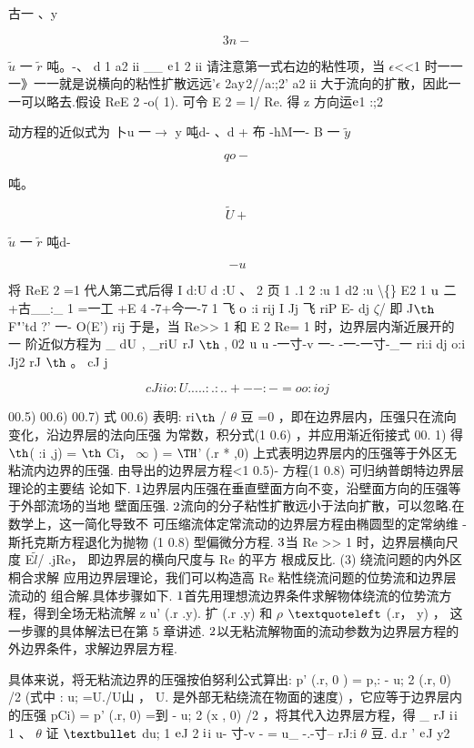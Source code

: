 古一 、y

\[3n-\]

$\tilde{u}$ 一 $\tilde{r}$ 吨。-、 d 1 a2 ii \_\_ ${\rm e}$1 2 ii 请注意第一式右边的粘性项，当 $\epsilon$<<1 时一一一》一一就是说横向的粘性扩散远远'$\epsilon$ 2a${\rm y}$2//a:;2' a2 ii 大于流向的扩散，因此一一可以略去.假设 ReE 2 -o( 1). 可令 E 2 = l/ Re. 得 z 方向运${\rm e}$1 :;2

动方程的近似式为 卜u 一$\rightarrow$ y 吨d- 、d + 布 -hM一- B 一 $\tilde{y}$

\[qo-\]

吨。

\[\tilde{U} +\]

$\tilde{u}$ 一 $\tilde{r}$ 吨d-

\[-u\]

将 ReE 2 =1 代人第二式后得 I d:U d :U 、 2 页 1 .1 2 :u 1 d2 :u \textbackslash\{\} E2 1 ${\rm u}$ 二+古\_\_:\_ 1 =一工 +E 4 -7+今一-7 1 飞 ${\rm o}$ :i rij I Jj 飞 riP E- dj $\zeta$/ 即 J${\rm þ}$ F"'td ?' 一- O(E') rij 于是，当 Re>> 1 和 E 2 Re= 1 时，边界层内渐近展开的 一 阶近似方程为 \_ d${\rm U}$ , \_ri${\rm U}$ rJ ${\rm þ}$ , 02 ${\rm u}$ u -一寸-v 一- -一-一寸-\_一 ri:i dj o:i Jj2 rJ ${\rm þ}$ 。 cJ j

\[cJ ii o:U .....:.:..+--:-=o o:i oj\]

00.5) 00.6) 00.7) 式 00.6) 表明: ri${\rm þ}$ / $\theta$ 豆 =0 ，即在边界层内，压强只在流向变化，沿边界层的法向压强 为常数，积分式(1 0.6) ，并应用渐近衔接式 00. 1) 得 ${\rm þ}$( :i ,j) = ${\rm þ}$ Ci， $\infty$ ) = ${\rm Þ}$' (.r * ,0) 上式表明边界层内的压强等于外区无粘流内边界的压强. 由导出的边界层方程<1 0.5)- 方程(1 0.8) 可归纳普朗特边界层理论的主要结 论如下. ${\rm 1}$边界层内压强在垂直壁面方向不变，沿壁面方向的压强等于外部流场的当地 壁面压强. ${\rm 2}$流向的分子粘性扩散远小于法向扩散，可以忽略.在数学上，这一简化导致不 可压缩流体定常流动的边界层方程由椭圆型的定常纳维 - 斯托克斯方程退化为抛物 (1 0.8) 型偏微分方程. ${\rm 3}$当 Re >> 1 时，边界层横向尺度 E$\tilde{l}$/ .jRe， 即边界层的横向尺度与 Re 的平方 根成反比. (3) 绕流问题的内外区桐合求解 应用边界层理论，我们可以构造高 Re 粘性绕流问题的位势流和边界层流动的 组合解.具体步骤如下. ${\rm 1}$首先用理想流边界条件求解物体绕流的位势流方程，得到全场无粘流解 z u' (.r .y). 扩 (.r .y) 和 $\rho$ ${\rm ‘}$ (.r， y) ， 这一步骤的具体解法已在第 5 章讲述. ${\rm 2}$以无粘流解物面的流动参数为边界层方程的外边界条件，求解边界层方程.

具体来说，将无粘流边界的压强按伯努利公式算出: p' (.r, 0 ) = p,: - u; 2 (.r, 0) /2 (式中 : u; =U./U山 ， U. 是外部无粘绕流在物面的速度) ，它应等于边界层内的压强 pCi) = p' (.r, 0) =到 - u; 2 (x , 0) /2 ，将其代入边界层方程，得 \_ rJ ${\rm i}$i 1 、 $\theta$ 证 ${\rm •}$ du; 1 ${\rm e}$J 2 ${\rm i}$i u- 寸-v - = u\_ -.-寸-- rJ:i $\theta$ 豆. d.r ' ${\rm e}$J y2

